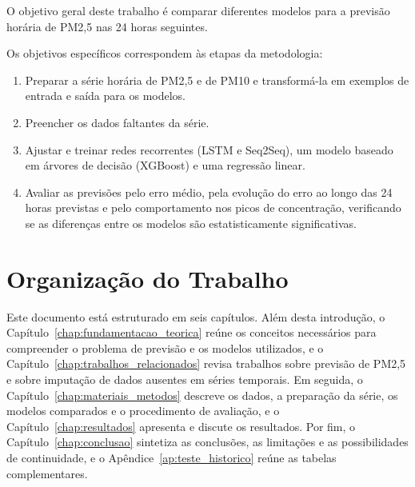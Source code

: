 O objetivo geral deste trabalho é comparar diferentes modelos para a previsão horária de PM2,5 nas 24 horas seguintes.

Os objetivos específicos correspondem às etapas da metodologia:

\begin{enumerate}
    \item Preparar a série horária de PM2,5 e de PM10 e transformá-la em exemplos de entrada e saída para os modelos.
    \item Preencher os dados faltantes da série.
    \item Ajustar e treinar redes recorrentes (LSTM e Seq2Seq), um modelo baseado em árvores de decisão (XGBoost) e uma regressão linear.
    \item Avaliar as previsões pelo erro médio, pela evolução do erro ao longo das 24 horas previstas e pelo comportamento nos picos de concentração, verificando se as diferenças entre os modelos são estatisticamente significativas.
\end{enumerate}

\section{Organização do Trabalho}

Este documento está estruturado em seis capítulos. Além desta introdução, o Capítulo~\ref{chap:fundamentacao_teorica} reúne os conceitos necessários para compreender o problema de previsão e os modelos utilizados, e o Capítulo~\ref{chap:trabalhos_relacionados} revisa trabalhos sobre previsão de PM2,5 e sobre imputação de dados ausentes em séries temporais. Em seguida, o Capítulo~\ref{chap:materiais_metodos} descreve os dados, a preparação da série, os modelos comparados e o procedimento de avaliação, e o Capítulo~\ref{chap:resultados} apresenta e discute os resultados. Por fim, o Capítulo~\ref{chap:conclusao} sintetiza as conclusões, as limitações e as possibilidades de continuidade, e o Apêndice~\ref{ap:teste_historico} reúne as tabelas complementares.
